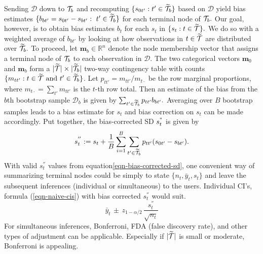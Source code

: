 Sending $\mathcal{D}$ down to $\mathcal{T}_b$ and recomputing $\{s_{0t'}: t' \in \widetilde{\mathcal{T}}_b\}$ based on $\mathcal{D}$ yield bias estimates $\{ b_{bt'} = s_{0t'} - s_{bt'}:~ t' \in \widetilde{\mathcal{T}}_b\}$ for each terminal node of $\mathcal{T}_b.$ 
Our goal, however, is to obtain bias estimates $b_t$ for each $s_t$ in $\{s_t: t \in \widetilde{\mathcal{T}}\}.$ We do so with a weighted average of $b_{bt'}$ by looking at how observations in $t \in \widetilde{\mathcal{T}}$ are distributed over $\widetilde{\mathcal{T}}_b.$ To proceed, let $\mathbf{m}_b\in \mathbb{R}^n$ denote the node membership vector that assigns a terminal node of $\mathcal{T}_b$ to each observation in $\mathcal{D}.$ The two categorical vectors $\mathbf{m}_0$ and $\mathbf{m}_b$ form a $|\widetilde{\mathcal{T}}| \times |\widetilde{\mathcal{T}}_b|$ two-way contingency table with counts 
$\{m_{tt'}: t \in \widetilde{\mathcal{T}} \mbox{~and~} t' \in \widetilde{\mathcal{T}}_b\}$.  Let $p_{tt'} = m_{tt'}/m_{t\cdot}$ be the row marginal proportions, where $m_{t\cdot} = \sum_{t'} m_{tt'}$ is the $t$-th row total. Then an estimate of the bias from the $b$th bootstrap sample $\mathcal{D}_b$ is given by
$\sum_{t' \in \widetilde{\mathcal{T}}_b} p_{tt'} b_{bt'}.$ Averaging over $B$ bootstrap samples leads to a bias estimate for $s_t$ and bias correction on $s_t$ can be made accordingly. Put together, the bias-corrected SD $s_t^"$ is given by 
\begin{equation}
\label{eqn-bias-corrected-sd}
s^{''}_t := s_t + \frac{1}{B} \sum_{i=1}^B \sum_{t' \in \widetilde{\mathcal{T}}_b} p_{tt'} (s_{0t'} - s_{bt'}). 
\end{equation}
With valid $s^{''}_t$ values from equation\ref{eqn-bias-corrected-sd}, one convenient way of summarizing terminal nodes could be simply to state $\{n_t, \bar{y}_t, s_t\}$ and leave the subsequent inferences (individual or simultaneous) to the users.  Individual CI's, formula (\ref{eqn-naive-cis})  with bias corrected $s^{''}_t$ would suit.
\begin{equation}
\label{eqn-naive-cis}
\bar{y}_t \, \pm  \, z_{1-\alpha/2} \, \frac{s^{''}_t}{\sqrt{n_t}}
\end{equation} 
For simultaneous inferences, Bonferroni, FDA (false discovery rate), and other types of adjustment can be applicable. Especially if $|\widetilde{\mathcal{T}}|$ is small or moderate, Bonferroni is  appealing.%



